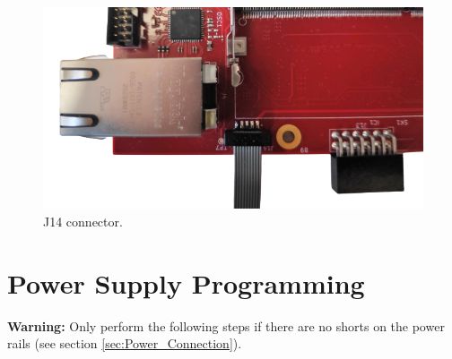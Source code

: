 \documentclass[12pt,oneside,a4]{article}
\begin{document}
\begin{figure}[H]
\begin{center}
\includegraphics[width=0.8\linewidth]{mmcjtag.png}
 \caption{J14 connector. }\label{23}
\end{center}
\end{figure}


\section{Power Supply Programming}

\textbf{Warning:} Only perform the following steps if there are no shorts on the power rails (see section \ref{sec:Power_Connection}).
\end{document}
